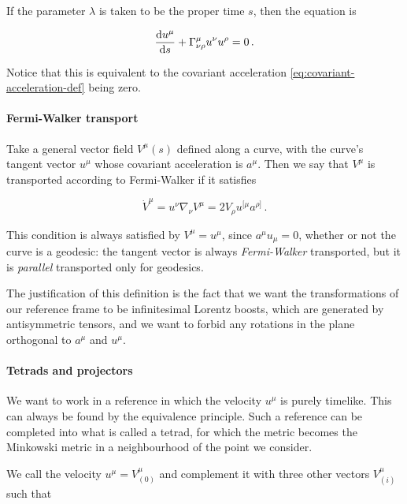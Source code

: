 \documentclass[main.tex]{subfiles}
\begin{document}
If the parameter $\lambda$ is taken to be the proper time $s$, then the equation is

\begin{equation}
    \dv{u^\mu}{s} + \Gamma^\mu _{\nu\rho} u^\nu u^\rho = 0 \,.
\end{equation}

Notice that this is equivalent to the covariant acceleration \eqref{eq:covariant-acceleration-def} being zero.

\paragraph{Fermi-Walker transport}

Take a general vector field \(V ^{\mu} (s)\) defined along a curve, with the curve's tangent vector \(u^\mu\) whose covariant acceleration is \(a^\mu\).
Then we say that \(V^\mu\) is transported according to Fermi-Walker if it satisfies

\begin{equation} \label{eq:fermi-walker-transport}
    \dot{V}^\mu  = u^\nu \nabla_\nu V^\mu
    = 2 V_\rho u^{[\mu} a^{\rho]} \,.
\end{equation}

This condition is always satisfied by \(V^\mu = u^\mu\), since \(a^\mu u_\mu = 0\), whether or not the curve is a geodesic: the tangent vector is always \emph{Fermi-Walker} transported, but it is \emph{parallel} transported only for geodesics.

The justification of this definition is the fact that we want the transformations of our reference frame to be infinitesimal Lorentz boosts, which are generated by antisymmetric tensors, and we want to forbid any rotations in the plane orthogonal to \(a^\mu\) and \(u^\mu\).

\paragraph{Tetrads and projectors} \label{par:tetrads}

We want to work in a reference in which the velocity $u^\mu$ is purely timelike. This can always be found by the equivalence principle. Such a reference can be completed into what  is called a tetrad, for which the metric becomes the Minkowski metric in a neighbourhood of the point we consider.

We call the velocity \(u^\mu = V^\mu _{(0)}\) and complement it with three other vectors \(V^\mu_{(i)}\) such that
\end{document}
